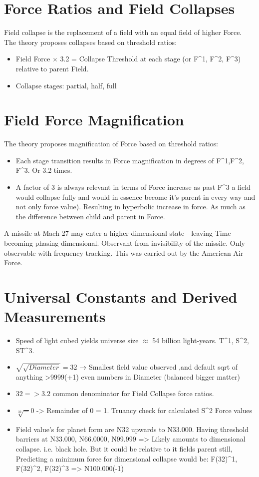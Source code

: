 \documentclass[12pt]{thesis}
\begin{document}
\section{Force Ratios and Field Collapses}
Field collapse is the replacement of a field with an equal field of higher Force.
The theory proposes collapses based on threshold ratios:
\begin{itemize}
    \item Field Force $\times$ 3.2 = Collapse Threshold at each stage (or F^1, F^2, F^3) relative to parent Field.
    \item Collapse stages: partial, half, full
\end{itemize}

\section{Field Force Magnification}
The theory proposes magnification of Force based on threshold ratios:
\begin{itemize}
    \item Each stage transition results in Force magnification in degrees of F^1,F^2, F^3. Or 3.2 times.
    \item A factor of 3 is always relevant in terms of Force increase as past F^3 a field would collapse fully and would in essence become it's parent in every way and not only force value). Resulting in hyperbolic increase in force. As much as the difference between child and parent in Force. 
\end{itemize}

A missile at Mach 27 may enter a higher dimensional state—leaving Time becoming phasing-dimensional.
Observant from invisibility of the missile. Only observable with frequency tracking. This was carried out by the American Air Force.

\section{Universal Constants and Derived Measurements}
\begin{itemize}
    \item Speed of light cubed yields universe size $\approx$ 54 billion light-years. T^1, S^2, ST^3.
    \item $\sqrt{\sqrt{Diameter}} = 32$ → Smallest field value observed ,and default sqrt of anything >9999(+1) even numbers in Diameter (balanced bigger matter) 
    \item {$32 => 3.2$} common denominator for Field Collapse force ratios.
    \item $\sqrt[32] = 0$ -> Remainder of 0 = 1. Truancy check for calculated S^2 Force values
    \item Field value's for planet form are N32 upwards to N33.000. Having threshold barriers at N33.000, N66.0000, N99.999 => Likely amounts to dimensional collapse. i.e. black hole. But it could be relative to it fields parent still, Predicting a minimum force for dimensional collapse  would be:
    F(32)^1, F(32)^2, F(32)^3 => N100.000(-1) 
\end{itemize}
\end{document}
